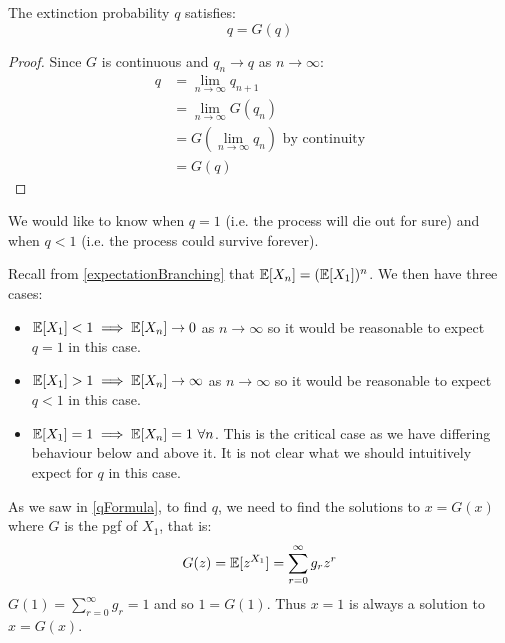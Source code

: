 \documentclass[../main.tex]{subfiles}
\begin{document}
\begin{corollary}
  The extinction probability $q$ satisfies:
  \label{qFormula}
  \[
    q = G(q)
  \]
\end{corollary}
\begin{proof}
  Since $G$ is continuous and $q_n \to q$ as $n \to \infty$:
  \begin{align*}
    q &= \lim_{n \to \infty} q_{n + 1} \\
      &= \lim_{n \to \infty} G(q_n) \\
      &= G\left(\lim_{n \to \infty} q_n\right) \text{ by continuity} \\
      &= G(q)
  \end{align*}
\end{proof}
We would like to know when $q = 1$ (i.e. the process will die out for sure) and when $q < 1$ (i.e. the process could survive forever).

Recall from \cref{expectationBranching} that $\mathbb{E}[X_n] = (\mathbb{E}[X_1])^{n}$.
We then have three cases:
\begin{itemize}
  \item $\mathbb{E}[X_1] < 1 \implies \mathbb{E}[X_n] \to 0$ as $n \to \infty$ so it would be reasonable to expect $q = 1$ in this case.
  \item $\mathbb{E}[X_1] > 1 \implies \mathbb{E}[X_n] \to \infty$ as $n \to \infty$ so it would be reasonable to expect $q < 1$ in this case.
  \item $\E[X_1] = 1 \implies \E[X_n] = 1\ \forall n$.
    This is the critical case as we have differing behaviour below and above it.
    It is not clear what we should intuitively expect for $q$ in this case.
\end{itemize}
As we saw in \cref{qFormula}, to find $q$, we need to find the solutions to $x = G(x)$ where $G$ is the pgf of $X_1$, that is:
\[
  G(z) = \mathbb{E}[z^{X_1}] = \sum_{r = 0}^{\infty} g_r z^{r}
\]
$G(1) = \sum_{r = 0}^{\infty} g_r = 1$ and so $1 = G(1)$.
Thus $x = 1$ is always a solution to $x = G(x)$.
\end{document}
